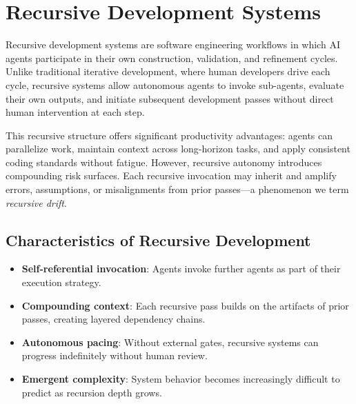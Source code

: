 \section{Recursive Development Systems}
\label{sec:recursive-development}

%

Recursive development systems are software engineering workflows in which AI agents
participate in their own construction, validation, and refinement cycles. Unlike
traditional iterative development, where human developers drive each cycle, recursive
systems allow autonomous agents to invoke sub-agents, evaluate their own outputs, and
initiate subsequent development passes without direct human intervention at each step.

This recursive structure offers significant productivity advantages: agents can parallelize
work, maintain context across long-horizon tasks, and apply consistent coding standards
without fatigue. However, recursive autonomy introduces compounding risk surfaces.
Each recursive invocation may inherit and amplify errors, assumptions, or misalignments
from prior passes—a phenomenon we term \textit{recursive drift}.

\subsection{Characteristics of Recursive Development}

\begin{itemize}
  \item \textbf{Self-referential invocation}: Agents invoke further agents as part of
    their execution strategy.
  \item \textbf{Compounding context}: Each recursive pass builds on the artifacts of
    prior passes, creating layered dependency chains.
  \item \textbf{Autonomous pacing}: Without external gates, recursive systems can
    progress indefinitely without human review.
  \item \textbf{Emergent complexity}: System behavior becomes increasingly difficult
    to predict as recursion depth grows.
\end{itemize}

